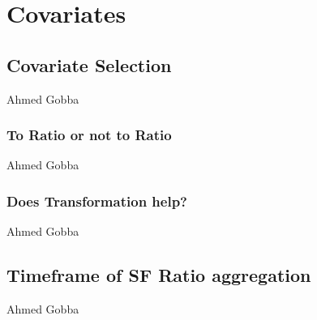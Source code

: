 
\chapter{Covariates } %

\label{ChapterX} %


\section{Covariate Selection}

Ahmed Gobba
\subsection{To Ratio or not to Ratio}

Ahmed Gobba

\subsection{Does Transformation help?}
Ahmed Gobba

\section{Timeframe of SF Ratio aggregation}

Ahmed Gobba